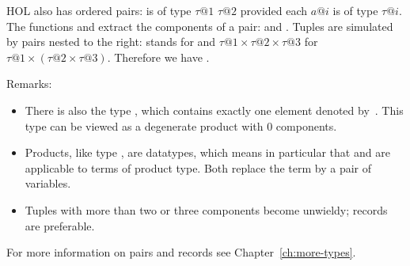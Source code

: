 %
\begin{isabellebody}%
\def\isabellecontext{pairs}%
\isamarkupfalse%
%
\isadelimtheory
%
\endisadelimtheory
%
\isatagtheory
%
\endisatagtheory
{\isafoldtheory}%
%
\isadelimtheory
%
\endisadelimtheory
%
\begin{isamarkuptext}%
\label{sec:pairs}
HOL also has ordered pairs:  is of type $\tau@1$
 $\tau@2$ provided each $a@i$ is of type
$\tau@i$. The functions  and
 extract the components of a pair:
  and . Tuples
are simulated by pairs nested to the right:  stands
for  and $\tau@1 \times \tau@2 \times \tau@3$ for
$\tau@1 \times (\tau@2 \times \tau@3)$. Therefore we have
.

Remarks:
\begin{itemize}
\item
There is also the type , which contains exactly one
element denoted by~\cdx{()}.  This type can be viewed
as a degenerate product with 0 components.
\item
Products, like type , are datatypes, which means
in particular that  and  are applicable to
terms of product type.
Both replace the term by a pair of variables.
\item
Tuples with more than two or three components become unwieldy;
records are preferable.
\end{itemize}
For more information on pairs and records see Chapter~\ref{ch:more-types}.%
\end{isamarkuptext}%
\isamarkuptrue%
%
\isadelimtheory
%
\endisadelimtheory
%
\isatagtheory
%
\endisatagtheory
{\isafoldtheory}%
%
\isadelimtheory
%
\endisadelimtheory
\end{isabellebody}%
